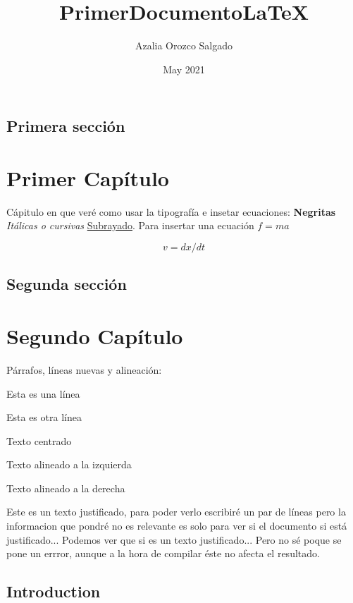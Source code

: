 \documentclass[letterpaper,12pt,twoside]{book}
\title{PrimerDocumentoLaTeX}
\author{Azalia Orozco Salgado}
\date{May 2021}
\begin{document}
\section{Primera sección}
\chapter{Primer Capítulo}
Cápitulo en que veré como usar la tipografía e insetar ecuaciones:
\textbf{Negritas} \textit{Itálicas o cursivas} \underline{Subrayado}. Para insertar una ecuación $f=ma$

\begin{equation} 
v=dx/dt
\end{equation}
\section{Segunda sección}
\chapter{Segundo Capítulo}
Párrafos, líneas nuevas y alineación:


Esta es una línea \par Esta es otra línea
\begin{center}
Texto centrado
\end{center}
\begin{flushleft}
Texto alineado a la izquierda
\end{flushleft}
\begin{flushright}
Texto alineado a la derecha
\end{flushright}

\justify
Este es un texto justificado, para poder verlo escribiré un par de líneas pero la informacion que pondré no es relevante es solo para ver si el documento si está justificado... Podemos ver que si es un texto justificado... Pero no sé poque se pone un errror, aunque a la hora de compilar éste no afecta el resultado.
\maketitle

\section{Introduction}
\end{document}
